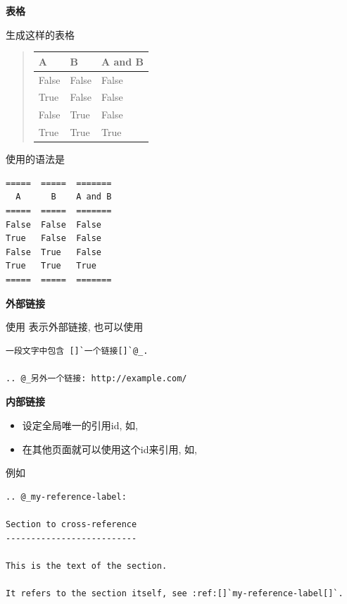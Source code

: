 \documentclass[letterpaper,10pt,english]{sphinxmanual}
\begin{document}
\textbf{表格}

生成这样的表格
\begin{quote}

\begin{tabulary}{\linewidth}{|L|L|L|}
\hline
\textbf{
A
} & \textbf{
B
} & \textbf{
A and B
}\\
\hline

False
 &
False
 &
False
\\

True
 &
False
 &
False
\\

False
 &
True
 &
False
\\

True
 &
True
 &
True
\\
\hline
\end{tabulary}

\end{quote}

使用的语法是

\begin{Verbatim}[commandchars=@\[\]]
=====  =====  =======
  A      B    A and B
=====  =====  =======
False  False  False
True   False  False
False  True   False
True   True   True
=====  =====  =======
\end{Verbatim}

\textbf{外部链接}

使用  表示外部链接, 也可以使用

\begin{Verbatim}[commandchars=@\[\]]
一段文字中包含 []`一个链接[]`@_.

.. @_另外一个链接: http://example.com/
\end{Verbatim}

\textbf{内部链接}
\begin{itemize}
\item {}
设定全局唯一的引用id, 如,  

\item {}
在其他页面就可以使用这个id来引用, 如, 

\end{itemize}

例如

\begin{Verbatim}[commandchars=@\[\]]
.. @_my-reference-label:

Section to cross-reference
--------------------------

This is the text of the section.

It refers to the section itself, see :ref:[]`my-reference-label[]`.
\end{Verbatim}
\end{document}
